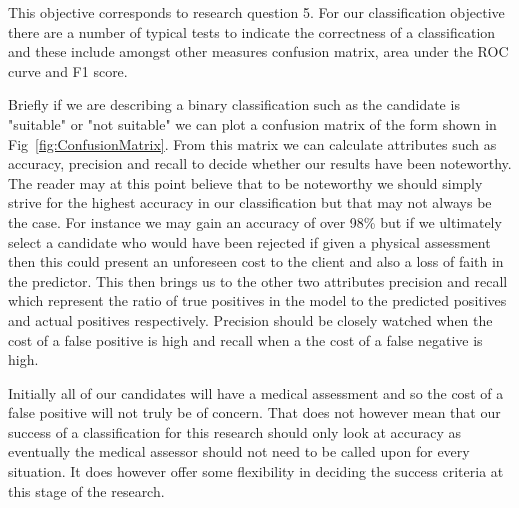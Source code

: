 This objective corresponds to research question 5. For our classification objective there are a number of typical tests to indicate the correctness of a classification and these include amongst other measures confusion matrix, area under the ROC curve and F1 score.




Briefly if we are describing a binary classification such as the candidate is "suitable" or "not suitable" we can plot a confusion matrix of the form shown in Fig~\ref{fig:ConfusionMatrix}. From this matrix we can calculate attributes such as accuracy, precision and recall to decide whether our results have been noteworthy. The reader may at this point believe that to be noteworthy we should simply strive for the highest accuracy in our classification but that may not always be the case. For instance we may gain an accuracy of over 98\% but if we ultimately select a candidate who would have been rejected if given a physical assessment then this could present an unforeseen cost to the client and also a loss of faith in the predictor. This then brings us to the other two attributes precision and recall which represent the ratio of true positives in the model to the predicted positives and actual positives respectively. Precision should be closely watched when the cost of a false positive is high and recall when a the cost of a false negative is high.

Initially all of our candidates will have a medical assessment and so the cost of a false positive will not truly be of concern. That does not however mean that our success of a classification for this research should only look at accuracy as eventually the medical assessor should not need to be called upon for every situation. It does however offer some flexibility in deciding the success criteria at this stage of the research.

